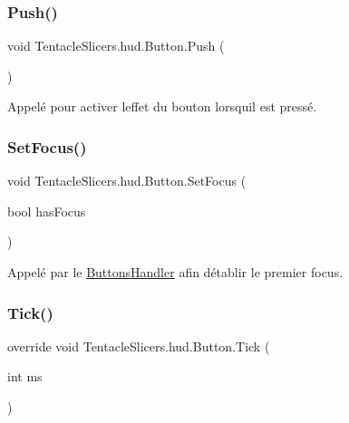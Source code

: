 \subsubsection{\texorpdfstring{Push()}{Push()}}
{\footnotesize\ttfamily void Tentacle\+Slicers.\+hud.\+Button.\+Push (\begin{DoxyParamCaption}{ }\end{DoxyParamCaption})}



Appelé pour activer l\textquotesingle{}effet du bouton lorsqu\textquotesingle{}il est pressé. 

\mbox{\label{class_tentacle_slicers_1_1hud_1_1_button_ae9a492344e8206e714c49e4d972401cc}} 
\subsubsection{\texorpdfstring{Set\+Focus()}{SetFocus()}}
{\footnotesize\ttfamily void Tentacle\+Slicers.\+hud.\+Button.\+Set\+Focus (\begin{DoxyParamCaption}\item[{bool}]{has\+Focus }\end{DoxyParamCaption})}



Appelé par le \hyperlink{class_tentacle_slicers_1_1hud_1_1_buttons_handler}{Buttons\+Handler} afin d\textquotesingle{}établir le premier focus. 

\mbox{\label{class_tentacle_slicers_1_1hud_1_1_button_a47c46346d353d9a9bb23a65ae27490d2}} 
\subsubsection{\texorpdfstring{Tick()}{Tick()}}
{\footnotesize\ttfamily override void Tentacle\+Slicers.\+hud.\+Button.\+Tick (\begin{DoxyParamCaption}\item[{int}]{ms }\end{DoxyParamCaption})\hspace{0.3cm}{\ttfamily [virtual]}}



